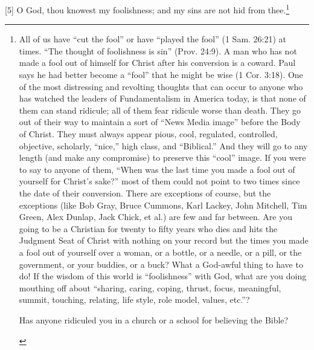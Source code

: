 [5] \textcolor[rgb]{0.00,0.00,1.00}{O God, thou knowest my foolishness; and my sins are not hid from thee.}\footnote{All of us have “cut the fool” or have “played the fool” (1 Sam. 26:21) at times. “The thought of foolishness is sin” (Prov. 24:9). A man who has not made a fool out of himself for Christ after his conversion is a coward. Paul says he had better become a “fool” that he might be wise (1 Cor. 3:18). One of the most distressing and revolting thoughts that can occur to anyone who has watched the leaders of Fundamentalism in America today, is that none of them can stand ridicule; all of them fear ridicule worse than death. They go out of their way to maintain a sort of “News Media image” before the Body of Christ. They must always appear pious, cool, regulated, controlled, objective, scholarly, “nice,” high class, and “Biblical.” And they will go to any length (and make any compromise) to preserve this “cool” image. If you were to say to anyone of them, “When was the last time you made a fool out of yourself for Christ’s sake?” most of them could not point to two times since the date of their conversion. There are exceptions of course, but the exceptions (like Bob Gray, Bruce Cummons, Karl Lackey, John Mitchell, Tim Green, Alex Dunlap, Jack Chick, et al.) are few and far between. Are you going to be a Christian for twenty to fifty years who dies and hits the Judgment Seat of Christ with nothing on your record but the times you made a fool out of yourself over a woman, or a bottle, or a needle, or a pill, or the government, or your buddies, or a buck? What a God-awful thing to have to do! If the wisdom of this world is “foolishness” with God, what are you doing mouthing off about “sharing, caring, coping, thrust, focus, meaningful, summit, touching, relating, life style, role model, values, etc.”? \cite{Ruckman1992Psalms}  
\begin{compactenum}
\item Has anyone ridiculed you in a church or a school for believing the Bible?

\end{compactenum}}
